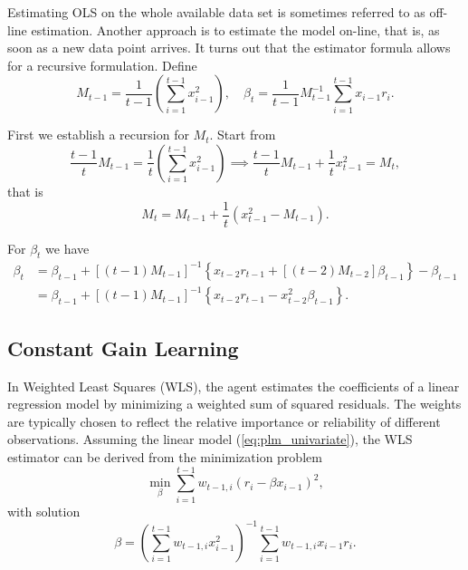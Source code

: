 \documentclass[11pt]{article}
\begin{document}
Estimating OLS on the whole available data set is sometimes referred to as off-line estimation. 
Another approach is to estimate the model on-line, that is, as soon as a new data point arrives. 
It turns out that the estimator formula allows for a recursive formulation.
Define 
\begin{equation}
M_{t-1} = \frac{1}{t-1}  \left(\sum^{t-1}_{i=1}  x_{i-1}^2 \right), \quad \beta_t = \frac{1}{t-1} M^{-1}_{t-1} \sum^{t-1}_{i=1}  x_{i-1} r_i.
\end{equation}

First we establish a recursion for $M_t$. Start from 
\begin{equation}
\frac{t-1}{t} M_{t-1} = \frac{1}{t}  \left(\sum^{t-1}_{i=1}  x_{i-1}^2 \right) \implies \frac{t-1}{t} M_{t-1} + \frac{1}{t} x_{t-1}^2 = M_t,
\end{equation}
that is
\begin{equation}
    M_t = M_{t-1} + \frac{1}{t} \left(x_{t-1}^2 - M_{t-1} \right).
\end{equation}

For $\beta_t$ we have
\begin{equation}\label{eq:b_t_evolution}
    \begin{aligned}
        \beta_t & = \beta_{t-1} + \left[(t-1) M_{t-1} \right]^{-1} \left\{ x_{t-2} r_{t-1} + \left[(t-2) M_{t-2} \right] \beta_{t-1} \right\} - \beta_{t-1} \\
        & = \beta_{t-1} + \left[(t-1) M_{t-1} \right]^{-1} \left\{ x_{t-2} r_{t-1} - x_{t-2}^2 \beta_{t-1} \right\}.
    \end{aligned}
\end{equation}

\subsection{Constant Gain Learning}\label{app:WLS}
In Weighted Least Squares (WLS), the agent estimates the coefficients of a linear regression model by minimizing a weighted sum of squared residuals.
The weights are typically chosen to reflect the relative importance or reliability of different observations. Assuming the linear model (\ref{eq:plm_univariate}),
the WLS estimator can be derived from the minimization problem
\begin{equation}
    \min_{\beta} \sum^{t-1}_{i=1} {w_{t-1,i}} (r_i - \beta x_{i-1}) ^2,
\end{equation}
with solution
\begin{equation}
    {\beta} = \left(\sum^{t-1}_{i=1} {w_{t-1,i}} x_{i-1}^2 \right)^{-1} \sum^{t-1}_{i=1} {w_{t-1,i}} x_{i-1} r_i.
\end{equation}
\end{document}
